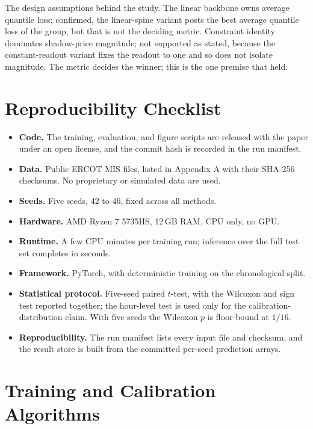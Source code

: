 \documentclass[twoside]{article}
\begin{document}
The design assumptions behind the study. The linear backbone owns average quantile loss; confirmed, the linear-spine variant posts the best average quantile loss of the group, but that is not the deciding metric. Constraint identity dominates shadow-price magnitude; not supported as stated, because the constant-readout variant fixes the readout to one and so does not isolate magnitude. The metric decides the winner; this is the one premise that held.

\section{Reproducibility Checklist}
\begin{itemize}\setlength\itemsep{2pt}
\item \textbf{Code.} The training, evaluation, and figure scripts are released with the paper under an open license, and the commit hash is recorded in the run manifest.
\item \textbf{Data.} Public ERCOT MIS files, listed in Appendix A with their SHA-256 checksums. No proprietary or simulated data are used.
\item \textbf{Seeds.} Five seeds, 42 to 46, fixed across all methods.
\item \textbf{Hardware.} AMD Ryzen 7 5735HS, 12\,GB RAM, CPU only, no GPU.
\item \textbf{Runtime.} A few CPU minutes per training run; inference over the full test set completes in seconds.
\item \textbf{Framework.} PyTorch, with deterministic training on the chronological split.
\item \textbf{Statistical protocol.} Five-seed paired $t$-test, with the Wilcoxon and sign test reported together; the hour-level test is used only for the calibration-distribution claim. With five seeds the Wilcoxon $p$ is floor-bound at $1/16$.
\item \textbf{Reproducibility.} The run manifest lists every input file and checksum, and the result store is built from the committed per-seed prediction arrays.
\end{itemize}

\section*{Training and Calibration Algorithms}
\end{document}
